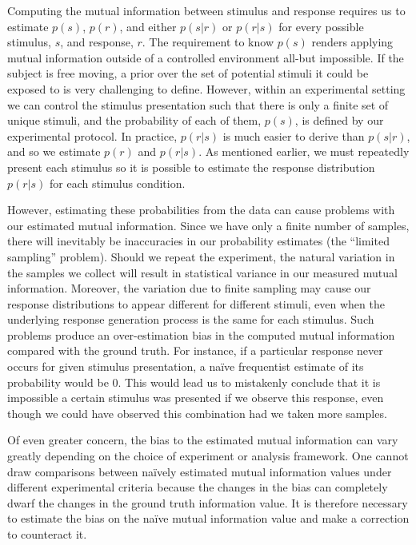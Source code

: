Computing the mutual information between stimulus and response requires us to estimate $p(s)$, $p(r)$, and either $p(s|r)$ or $p(r|s)$ for every possible stimulus, $s$, and response, $r$.
The requirement to know $p(s)$ renders applying mutual information outside of a controlled environment all-but impossible.
If the subject is free moving, a prior over the set of potential stimuli it could be exposed to is very challenging to define.
However, within an experimental setting we can control the stimulus presentation such that there is only a finite set of unique stimuli, and the probability of each of them, $p(s)$, is defined by our experimental protocol.
In practice, $p(r|s)$ is much easier to derive than $p(s|r)$, and so we estimate $p(r)$ and $p(r|s)$.
As mentioned earlier, we must repeatedly present each stimulus so it is possible to estimate the response distribution $p(r|s)$ for each stimulus condition.

However, estimating these probabilities from the data can cause problems with our estimated mutual information.
Since we have only a finite number of samples, there will inevitably be inaccuracies in our probability estimates (the ``limited sampling'' problem).
Should we repeat the experiment, the natural variation in the samples we collect will result in statistical variance in our measured mutual information.
Moreover, the variation due to finite sampling may cause our response distributions to appear different for different stimuli, even when the underlying response generation process is the same for each stimulus.
Such problems produce an over-estimation bias in the computed mutual information compared with the ground truth.
For instance, if a particular response never occurs for given stimulus presentation, a na{\"i}ve frequentist estimate of its probability would be $0$.
This would lead us to mistakenly conclude that it is impossible a certain stimulus was presented if we observe this response, even though we could have observed this combination had we taken more samples.

Of even greater concern, the bias to the estimated mutual information can vary greatly depending on the choice of experiment or analysis framework.
One cannot draw comparisons between na{\"i}vely estimated mutual information values under different experimental criteria because the changes in the bias can completely dwarf the changes in the ground truth information value.
It is therefore necessary to estimate the bias on the na{\"i}ve mutual information value and make a correction to counteract it.



